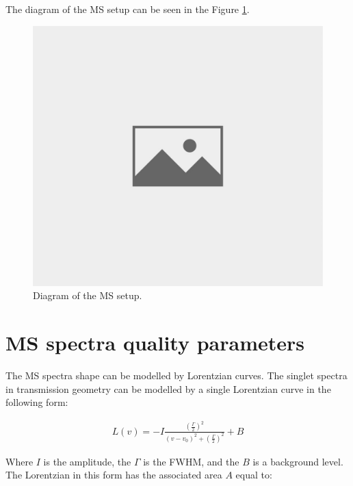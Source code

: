The diagram of the MS setup can be seen in the Figure \ref{diagram}.

\begin{figure}[H]
 \centering
 \includegraphics[scale=0.4, angle = 0]{./pictures/NoPicture.jpg}
 \caption{Diagram of the MS setup.}
 \label{diagram}
 
\end{figure}
 

\section{MS spectra quality parameters}
The MS spectra shape can be modelled by Lorentzian curves. The singlet spectra in transmission geometry can be modelled by a single Lorentzian curve in the following form:

\begin{equation}
\begin{aligned}
L(v) = -I\frac{(\frac{\Gamma}{2})^2}{(v - v_0)^2 + (\frac{\Gamma}{2})^2} + B
\end{aligned}
\label{lor}
\end{equation}

Where $I$ is the amplitude, the $\Gamma$ is the FWHM, and the $B$ is a background level. The Lorentzian in this form has the associated area $A$ equal to:

